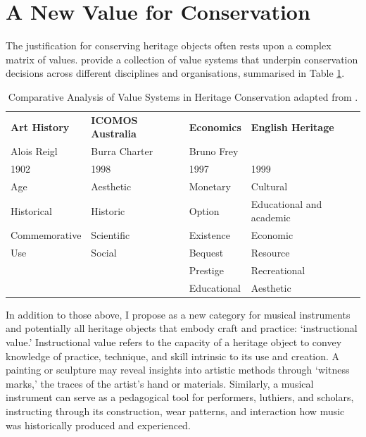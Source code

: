 \section{A New Value for Conservation}

The justification for conserving heritage objects often rests upon a complex matrix of values. \textcite{avrami_values_2000} provide a collection of value systems that underpin conservation decisions across different disciplines and organisations, summarised in Table \ref{tab:values_comparison}.

\begin{table}[h]
    \footnotesize
    \centering
        \begin{tabular}{llll}
            \toprule
            \textbf{Art History} & \textbf{ICOMOS Australia} & \textbf{Economics} & \textbf{English Heritage} \\
            Alois Reigl & Burra Charter & Bruno Frey &  \\ 
            1902 & 1998 & 1997 & 1999 \\ \hline
            Age & Aesthetic & Monetary & Cultural \\ 
            Historical & Historic & Option & Educational and academic \\ 
            Commemorative & Scientific & Existence & Economic \\ 
            Use & Social & Bequest & Resource \\ 
            & & Prestige & Recreational \\
            & & Educational & Aesthetic \\
            \bottomrule
        \end{tabular}    
    \caption{Comparative Analysis of Value Systems in Heritage Conservation adapted from \cite{avrami_values_2000}.}
    \label{tab:values_comparison}
\end{table}

In addition to those above, I propose as a new category for musical instruments and potentially all heritage objects that embody craft and practice: `instructional value.' Instructional value refers to the capacity of a heritage object to convey knowledge of practice, technique, and skill intrinsic to its use and creation. A painting or sculpture may reveal insights into artistic methods through `witness marks,' the traces of the artist’s hand or materials. Similarly, a musical instrument can serve as a pedagogical tool for performers, luthiers, and scholars, instructing through its construction, wear patterns, and interaction how music was historically produced and experienced.

